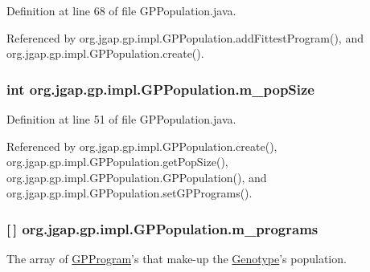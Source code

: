 Definition at line 68 of file G\-P\-Population.\-java.



Referenced by org.\-jgap.\-gp.\-impl.\-G\-P\-Population.\-add\-Fittest\-Program(), and org.\-jgap.\-gp.\-impl.\-G\-P\-Population.\-create().

\hypertarget{classorg_1_1jgap_1_1gp_1_1impl_1_1_g_p_population_a82de82c54ab2617c745e5493ed025e00}{
\subsubsection[{m\-\_\-pop\-Size}]{\setlength{\rightskip}{0pt plus 5cm}int org.\-jgap.\-gp.\-impl.\-G\-P\-Population.\-m\-\_\-pop\-Size\hspace{0.3cm}{\ttfamily [private]}}}\label{classorg_1_1jgap_1_1gp_1_1impl_1_1_g_p_population_a82de82c54ab2617c745e5493ed025e00}


Definition at line 51 of file G\-P\-Population.\-java.



Referenced by org.\-jgap.\-gp.\-impl.\-G\-P\-Population.\-create(), org.\-jgap.\-gp.\-impl.\-G\-P\-Population.\-get\-Pop\-Size(), org.\-jgap.\-gp.\-impl.\-G\-P\-Population.\-G\-P\-Population(), and org.\-jgap.\-gp.\-impl.\-G\-P\-Population.\-set\-G\-P\-Programs().

\hypertarget{classorg_1_1jgap_1_1gp_1_1impl_1_1_g_p_population_a3bf2729a02a6d7daa8d9badb52cd6c3a}{
\subsubsection[{m\-\_\-programs}]{ \mbox{[}$\,$\mbox{]} org.\-jgap.\-gp.\-impl.\-G\-P\-Population.\-m\-\_\-programs\hspace{0.3cm}{\ttfamily [private]}}}\label{classorg_1_1jgap_1_1gp_1_1impl_1_1_g_p_population_a3bf2729a02a6d7daa8d9badb52cd6c3a}
The array of \hyperlink{classorg_1_1jgap_1_1gp_1_1impl_1_1_g_p_program}{G\-P\-Program}'s that make-\/up the \hyperlink{classorg_1_1jgap_1_1_genotype}{Genotype}'s population. 

